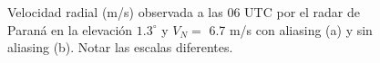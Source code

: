 \documentclass[12pt,spanish,oneside, a4paper]{book}
\title{}
\subtitle{Validación de parametrizaciones de capa límite utilizando datos de radar}
\author{Paola Corrales}
\date{}
\begin{document}
\begin{figure}

{\centering {}

}

\caption{Velocidad radial (m/s) observada a las 06 UTC por el radar de Paraná en la elevación $1.3^{\circ}$ y $V_N =$ 6.7 m/s con aliasing (a) y sin aliasing (b). Notar las escalas diferentes.}\label{fig:aliasing}
\end{figure}
\end{document}
